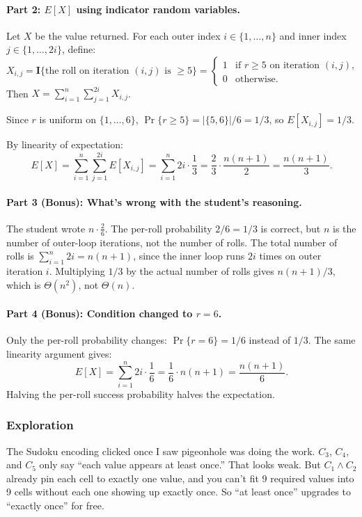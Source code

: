 \documentclass{article}
\theoremstyle{theorem}
\theoremstyle{definition}
\theoremstyle{remark}
\begin{document}
\paragraph{Part 2: $E[X]$ using indicator random variables.}
Let $X$ be the value returned. For each outer index $i \in \{1, \ldots, n\}$ and inner index $j \in \{1, \ldots, 2i\}$, define:
\[
  X_{i,j} = \mathbf{I}\{\text{the roll on iteration } (i, j) \text{ is } \ge 5\} =
  \begin{cases}
    1 & \text{if } r \ge 5 \text{ on iteration } (i, j), \\
    0 & \text{otherwise.}
  \end{cases}
\]
Then $X = \sum_{i=1}^{n} \sum_{j=1}^{2i} X_{i,j}$.

Since $r$ is uniform on $\{1, \ldots, 6\}$, $\Pr\{r \ge 5\} = |\{5, 6\}|/6 = 1/3$, so $E[X_{i,j}] = 1/3$.

By linearity of expectation:
\[
  E[X] = \sum_{i=1}^{n} \sum_{j=1}^{2i} E[X_{i,j}] = \sum_{i=1}^{n} 2i \cdot \frac{1}{3} = \frac{2}{3} \cdot \frac{n(n+1)}{2} = \frac{n(n+1)}{3}.
\]

\paragraph{Part 3 (Bonus): What's wrong with the student's reasoning.}
The student wrote $n \cdot \frac{2}{6}$. The per-roll probability $2/6 = 1/3$ is correct, but $n$ is the number of outer-loop iterations, not the number of rolls. The total number of rolls is $\sum_{i=1}^{n} 2i = n(n+1)$, since the inner loop runs $2i$ times on outer iteration $i$. Multiplying $1/3$ by the actual number of rolls gives $n(n+1)/3$, which is $\Theta(n^2)$, not $\Theta(n)$.

\paragraph{Part 4 (Bonus): Condition changed to $r = 6$.}
Only the per-roll probability changes: $\Pr\{r = 6\} = 1/6$ instead of $1/3$. The same linearity argument gives:
\[
  E[X] = \sum_{i=1}^{n} 2i \cdot \frac{1}{6} = \frac{1}{6} \cdot n(n+1) = \frac{n(n+1)}{6}.
\]
Halving the per-roll success probability halves the expectation.

\subsubsection{Exploration}

The Sudoku encoding clicked once I saw pigeonhole was doing the work. $C_3$, $C_4$, and $C_5$ only say ``each value appears at least once.'' That looks weak. But $C_1 \land C_2$ already pin each cell to exactly one value, and you can't fit 9 required values into 9 cells without each one showing up exactly once. So ``at least once'' upgrades to ``exactly once'' for free.
\end{document}
